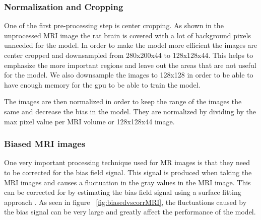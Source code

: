 \subsubsection{Normalization and Cropping}
    One of the first pre-processing step is center cropping. 
    As shown in the unprocessed MRI image the rat brain is covered with a lot of background pixels unneeded for the model.
    In order to make the model more efficient the images are center cropped and downsampled from 280x200x44 to 128x128x44.
    This helps to emphasize the more important regions and leave out the areas that are not useful for the model. 
    We also downsample the images to 128x128 in order to be able to have enough memory for the gpu to be able to train the model.
    
    The images are then normalized in order to keep the range of the images the same and decrease the bias in the model. 
    They are normalized by dividing by the max pixel value per MRI volume or 128x128x44 image.


\subsubsection{Biased MRI images}
     One very important processing technique used for MR images is that they need to be corrected for the bias field signal. 
     This signal is produced when taking the MRI images and causes a fluctuation in the gray values in the MRI image. 
     This can be corrected for by estimating the bias field signal using a surface fitting approach \cite{Juntu2005BiasFC}. 
     As seen in figure ~\ref{fig:biasedvscorrMRI}, the fluctuations caused by the bias signal can be very large and greatly affect the performance of the model. 
    
